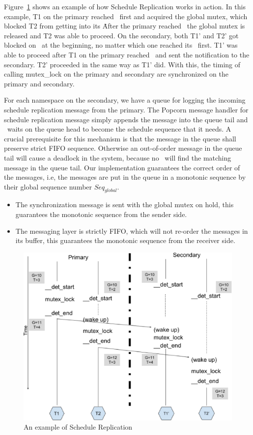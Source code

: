 Figure~\ref{f:scherep} shows an example of how Schedule Replication works in action. In this example, T1 on the primary reached \detstart\ first and acquired the global mutex, which blocked T2 from getting into its \detstart\. After the primary reached \detend\, the global mutex is released and T2 was able to proceed. On the secondary, both T1' and T2' got blocked on \detstart\ at the beginning, no matter which one reached its \detstart\ first. T1' was able to proceed after T1 on the primary reached \detend\ and sent the notification to the secondary. T2' proceeded in the same way as T1' did. With this, the timing of calling mutex\_lock on the primary and secondary are synchronized on the primary and secondary.

For each namespace on the secondary, we have a queue for logging the incoming schedule replication message from the primary. The Popcorn message handler for schedule replication message simply appends the message into the queue tail and \detstart\ waits on the queue head to become the schedule sequence that it needs. A crucial prerequisite for this mechanism is that the message in the queue shall preserve strict FIFO sequence. Otherwise an out-of-order message in the queue tail will cause a deadlock in the system, because no \detstart\ will find the matching message in the queue tail. Our implementation guarantees the correct order of the messages, i.e, the messages are put in the queue in a monotonic sequence by their global sequence number $Seq_{global}$.

\begin{itemize}
  \item The synchronization message is sent with the global mutex on hold, this guarantees the monotonic sequence from the sender side.
  \item The messaging layer is strictly FIFO, which will not re-order the messages in its buffer, this guarantees the monotonic sequence from the receiver side.
\end{itemize}

\begin{figure}
\centering
\includegraphics[width=0.9\columnwidth]{figures/sched_rep}
\caption{An example of Schedule Replication}
\label{f:scherep}
\end{figure}

